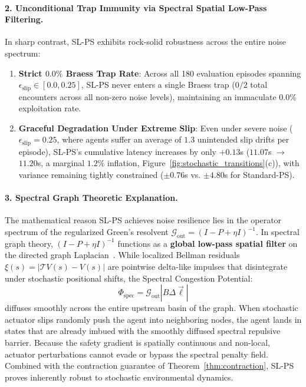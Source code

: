 \documentclass[11pt,a4paper]{article}
\begin{document}
\paragraph{2. Unconditional Trap Immunity via Spectral Spatial Low-Pass Filtering.}
In sharp contrast, SL-PS exhibits rock-solid robustness across the entire noise spectrum:
\begin{enumerate}
    \item \textbf{Strict $0.0\%$ Braess Trap Rate}: Across all 180 evaluation episodes spanning $\epsilon_{\text{slip}} \in [0.0, 0.25]$, SL-PS never enters a single Braess trap ($0/2$ total encounters across all non-zero noise levels), maintaining an immaculate $\mathbf{0.0\%}$ exploitation rate.
    \item \textbf{Graceful Degradation Under Extreme Slip}: Even under severe noise ($\epsilon_{\text{slip}} = 0.25$, where agents suffer an average of $1.3$ unintended slip drifts per episode), SL-PS's cumulative latency increases by only $\mathbf{+0.13}$s ($11.07$s $\to$ $11.20$s, a marginal $1.2\%$ inflation, Figure~\ref{fig:stochastic_transitions}(c)), with variance remaining tightly constrained ($\pm 0.76$s vs. $\pm 4.80$s for Standard-PS).
\end{enumerate}

\paragraph{3. Spectral Graph Theoretic Explanation.}
The mathematical reason SL-PS achieves noise resilience lies in the operator spectrum of the regularized Green's resolvent $\mathcal{G}_{\text{out}} = (I - P + \eta I)^{-1}$. In spectral graph theory, $(I - P + \eta I)^{-1}$ functions as a \textbf{global low-pass spatial filter} on the directed graph Laplacian~\cite{mahadevan2007proto,spielman2025sagt}. While localized Bellman residuals $\xi(s) = |\mathcal{T} V(s) - V(s)|$ are pointwise delta-like impulses that disintegrate under stochastic positional shifts, the Spectral Congestion Potential:
\begin{equation}
\Phi_{\text{spec}} = \mathcal{G}_{\text{out}} |B \Delta \vec{\ell}|
\end{equation}
diffuses smoothly across the entire upstream basin of the graph. When stochastic actuator slips randomly push the agent into neighboring nodes, the agent lands in states that are already imbued with the smoothly diffused spectral repulsive barrier. Because the safety gradient is spatially continuous and non-local, actuator perturbations cannot evade or bypass the spectral penalty field. Combined with the contraction guarantee of Theorem~\ref{thm:contraction}, SL-PS proves inherently robust to stochastic environmental dynamics.
\end{document}
